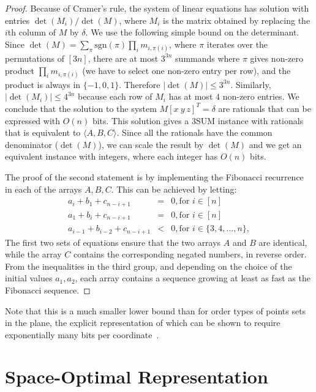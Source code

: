 \begin{proof}
Because of Cramer's rule, the system of linear equations has solution with entries
$\det(M_i)/\det(M)$,
where $M_i$ is the matrix obtained by replacing the $i$th column of $M$ by $\delta$.
We use the following simple bound on the determinant.
Since $\det(M)=\sum_{\pi}\mathrm{sgn}(\pi) \prod_i m_{i,\pi(i)}$, where
$\pi$ iterates over the permutations of $[3n]$, there are
at most $3^{3n}$ summands where $\pi$ gives non-zero product $\prod_i m_{i,\pi(i)}$ (we have
to select one non-zero entry per row), and the product is always in $\{ -1,0,1\}$.
Therefore $|\det(M)|\leq 3^{3n}$. Similarly, $|\det(M_i)|\leq 4^{3n}$ because
each row of $M_i$ has at most $4$ non-zero entries.
We conclude that the solution to the system $M [x~ y ~z]^T=\delta$
are rationals that can be expressed with $O(n)$ bits. This solution gives
a 3SUM instance with rationals that is equivalent to $\langle A, B, C \rangle$.
Since all the rationals have the common denominator ($\det(M)$), we can scale the result
by $\det(M)$ and we get an equivalent instance with integers, where
each integer has $O(n)$ bits.

The proof of the second statement is by implementing the Fibonacci recurrence in each of the
arrays $A,B,C$. This can be achieved by letting:
\begin{eqnarray*}
  a_i + b_1 + c_{n-i+1} & = & 0, \text{for }i\in [n] \\
  a_1 + b_i + c_{n-i+1} & = & 0, \text{for }i\in [n] \\
  a_{i-1} + b_{i-2} + c_{n-i+1} & < & 0, \text{for }i\in \{3,4,\ldots,n\},
\end{eqnarray*}
The first two sets of equations ensure that the two arrays $A$ and $B$ are identical, while
the array $C$ contains the corresponding negated numbers, in reverse order.
From the inequalities in the third group, and depending on the choice of the initial values $a_1, a_2$,
each array contains a sequence growing at least as fast as the Fibonacci sequence.
\end{proof}

Note that this is a much smaller lower bound than for order types of points sets in the plane,
the explicit representation of which can be shown to require exponentially many bits per coordinate~\cite{GPS89}.

\section{Space-Optimal Representation}%
\label{s:space}

